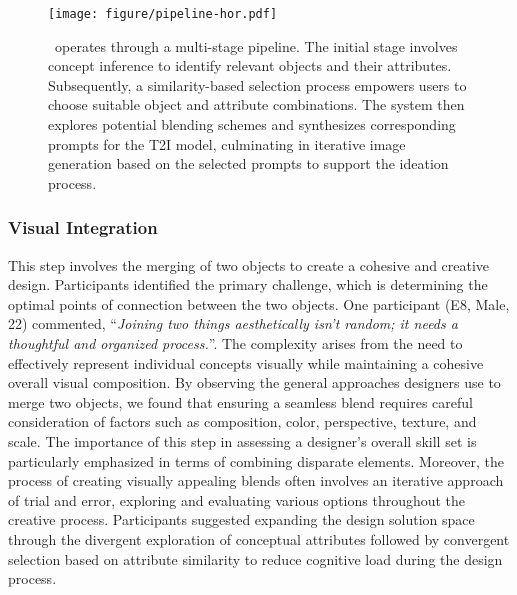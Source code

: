 

\begin{figure*}[t]
  \centering
  \texttt{[image: figure/pipeline-hor.pdf]}
  \caption{\sysname\ operates through a multi-stage pipeline.
  The initial stage involves concept inference to identify relevant objects and their attributes. Subsequently, a similarity-based selection process empowers users to choose suitable object and attribute combinations.
  The system then explores potential blending schemes and synthesizes corresponding prompts for the T2I model, culminating in iterative image generation based on the selected prompts to support the ideation process.}
     \label{fig:pipeline}
\end{figure*}



\subsubsection{Visual Integration}

This step involves the merging of two objects to create a cohesive and creative design. 
Participants identified the primary challenge, which is determining the optimal points of connection between the two objects. 
One participant (E8, Male, 22) commented, ``\textit{Joining two things aesthetically isn't random; it needs a thoughtful and organized process.}''.
The complexity arises from the need to effectively represent individual concepts visually while maintaining a cohesive overall visual composition.
By observing the general approaches designers use to merge two objects, we found that ensuring a seamless blend requires careful consideration of factors such as composition, color, perspective, texture, and scale.
The importance of this step in assessing a designer's overall skill set is particularly emphasized in terms of combining disparate elements. 
Moreover, the process of creating visually appealing blends often involves an iterative approach of trial and error, exploring and evaluating various options throughout the creative process.
Participants suggested expanding the design solution space through the divergent exploration of conceptual attributes followed by convergent selection based on attribute similarity to reduce cognitive load during the design process.




